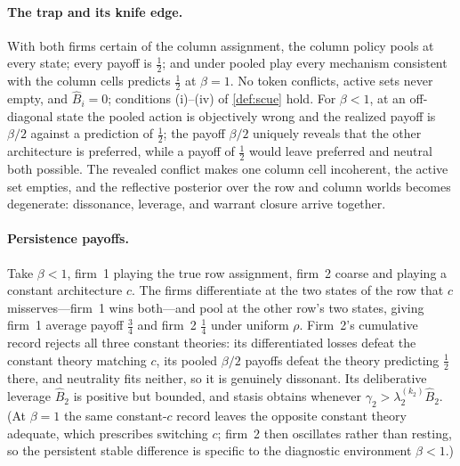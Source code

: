 \documentclass[11pt]{article}
\theoremstyle{definition}
\begin{document}
\paragraph{The trap and its knife edge.}
With both firms certain of the column assignment, the column policy pools at
every state; every payoff is $\tfrac12$; and under pooled play every mechanism
consistent with the column cells predicts $\tfrac12$ at $\beta=1$.  No token
conflicts, active sets never empty, and $\widehat B_i=0$; conditions (i)--(iv)
of \cref{def:scue} hold.  For $\beta<1$, at an off-diagonal state the pooled
action is objectively wrong and the realized payoff is $\beta/2$ against a
prediction of $\tfrac12$; the payoff $\beta/2$ uniquely reveals that the other
architecture is preferred, while a payoff of $\tfrac12$ would leave preferred
and neutral both possible.  The revealed conflict makes one column cell
incoherent, the active set empties, and the reflective posterior over the row
and column worlds becomes degenerate: dissonance, leverage, and warrant
closure arrive together.

\paragraph{Persistence payoffs.}
Take $\beta<1$, firm~1 playing the true row assignment, firm~2 coarse and
playing a constant architecture $c$.  The firms differentiate at the two
states of the row that $c$ misserves---firm~1 wins both---and pool at the
other row's two states, giving firm~1 average payoff $\tfrac34$ and firm~2
$\tfrac14$ under uniform $\rho$.  Firm~2's cumulative record rejects all three
constant theories: its differentiated losses defeat the constant theory
matching $c$, its pooled $\beta/2$ payoffs defeat the theory predicting
$\tfrac12$ there, and neutrality fits neither, so it is genuinely dissonant.
Its deliberative leverage $\widehat B_2$ is positive but bounded, and stasis
obtains whenever $\gamma_2>\lambda_2^{(k_2)}\widehat B_2$.  (At $\beta=1$ the
same constant-$c$ record leaves the opposite constant theory adequate, which
prescribes switching $c$; firm~2 then oscillates rather than resting, so the
persistent stable difference is specific to the diagnostic environment
$\beta<1$.)
\end{document}
